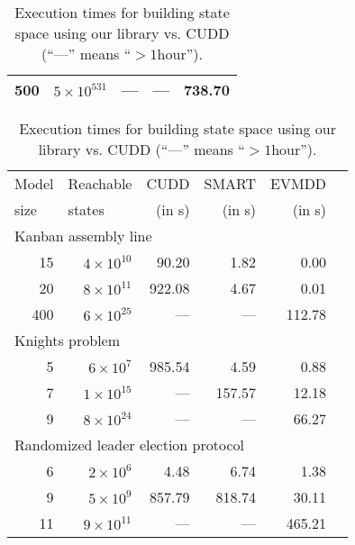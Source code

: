 \documentclass[a4paper]{easychair}
\begin{document}
{{\begin{table}[htb]
\begin{center}
{\begin{tabular}{|r||r||r|r|r|}
      500 & $5\times10^{531}$ &   --- & --- & 738.70 \\
      \hline
    \end{tabular}
    \hspace{2mm}
    \begin{tabular}{|r||r||r|r|r|r|}
      \hline
      \multicolumn{1}{|l||}{\footnotesize Model} & \multicolumn{1}{l||}{\footnotesize Reachable} & {\footnotesize CUDD} & {\footnotesize SMART} & {\footnotesize EVMDD} \\
      \multicolumn{1}{|l||}{\footnotesize size}  & \multicolumn{1}{l||}{\footnotesize states}  & {\footnotesize (in s)} & {\footnotesize (in s)} & {\footnotesize (in s)} \\
      \hline
      \multicolumn{5}{|l|}{Kanban assembly line}\\
      \hline
      15 & $4\times10^{10}$  &   90.20 & 1.82 &    0.00 \\
      20 & $8\times10^{11}$  &  922.08 & 4.67 &    0.01 \\
      400 & $6\times10^{25}$ &   --- & --- & 112.78 \\
      \hline
      \multicolumn{5}{|l|}{Knights problem}\\
      \hline
      5 & $6\times10^{7}$  &  985.54 & 4.59 &   0.88 \\
      7 & $1\times10^{15}$ &   --- & 157.57 &    12.18 \\
      9 & $8\times10^{24}$ &   --- & --- &   66.27 \\
      \hline
      \multicolumn{5}{|l|}{Randomized leader election protocol}\\
      \hline
      6 & $2\times10^{6}$   &    4.48 & 6.74 &    1.38 \\
      9 & $5\times10^{9}$   &  857.79 & 818.74 &   30.11 \\
      11 & $9\times10^{11}$ &   ---   & --- &  465.21 \\
      \hline
    \end{tabular}}
    \caption{Execution times for building state space using our library vs. CUDD (``---'' means ``$>1$hour'').}
    \label{table-results}
  \end{center}
\end{table}
}
\vspace*{-5mm}
}
\end{document}
